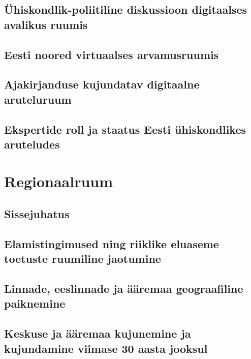 \documentclass[]{book}
\begin{document}
\hypertarget{chapter1_3}{%
\section{Ühiskondlik-poliitiline diskussioon digitaalses avalikus ruumis}\label{chapter1_3}}

\hypertarget{chapter_1.4}{%
\section{Eesti noored virtuaalses arvamusruumis}\label{chapter_1.4}}

\hypertarget{chapter_1.5}{%
\section{Ajakirjanduse kujundatav digitaalne aruteluruum}\label{chapter_1.5}}

\hypertarget{chapter_1.6}{%
\section{Ekspertide roll ja staatus Eesti ühiskondlikes aruteludes}\label{chapter_1.6}}

\hypertarget{chapter_2}{%
\chapter{Regionaalruum}\label{chapter_2}}

\hypertarget{sissejuhatus-2}{%
\section*{Sissejuhatus}\label{sissejuhatus-2}}

\hypertarget{regionaal_2.2}{%
\section{Elamistingimused ning riiklike eluaseme toetuste ruumiline jaotumine}\label{regionaal_2.2}}

\hypertarget{regionaal_2.3}{%
\section{Linnade, eeslinnade ja ääremaa geograafiline paiknemine}\label{regionaal_2.3}}

\hypertarget{chapter2_3}{%
\section{Keskuse ja ääremaa kujunemine ja kujundamine viimase 30 aasta jooksul}\label{chapter2_3}}
\end{document}
